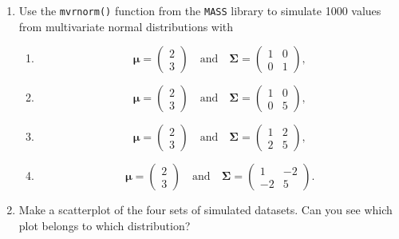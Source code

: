 \documentclass[
]{article}
\begin{document}
\begin{enumerate}
\def\labelenumi{\alph{enumi})}
\item
  Use the \texttt{mvrnorm()} function from the \texttt{MASS} library to
  simulate 1000 values from multivariate normal distributions with

  \begin{enumerate}
  \def\labelenumii{\roman{enumii})}
  \item
    \[ \boldsymbol{\mu} = \begin{pmatrix}
    2 \\
    3 
    \end{pmatrix} \quad \text{and} \quad \boldsymbol{\Sigma} = \begin{pmatrix}
    1 & 0\\
    0 & 1
    \end{pmatrix},\]
  \item
    \[ \boldsymbol{\mu} = \begin{pmatrix}
    2 \\
    3 
    \end{pmatrix} \quad \text{and} \quad \boldsymbol{\Sigma} = \begin{pmatrix}
    1 & 0\\
    0 & 5
    \end{pmatrix},\]
  \item
    \[ \boldsymbol{\mu} = \begin{pmatrix}
    2 \\
    3 
    \end{pmatrix} \quad \text{and} \quad \boldsymbol{\Sigma} = \begin{pmatrix}
    1 & 2\\
    2 & 5
    \end{pmatrix},\]
  \item
    \[ \boldsymbol{\mu} = \begin{pmatrix}
    2 \\
    3 
    \end{pmatrix} \quad \text{and} \quad \boldsymbol{\Sigma} = \begin{pmatrix}
    1 & -2\\
    -2 & 5
    \end{pmatrix}.\]
  \end{enumerate}
\item
  Make a scatterplot of the four sets of simulated datasets. Can you see
  which plot belongs to which distribution?
\end{enumerate}
\end{document}
